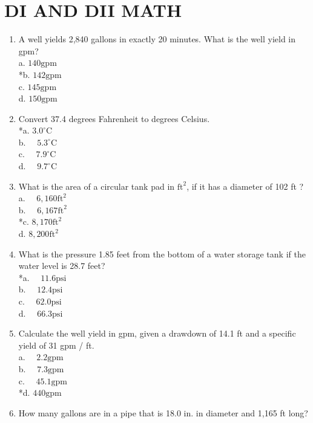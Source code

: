 \section{DI AND DII MATH}
\begin{enumerate}
\item A well yields 2,840 gallons in exactly 20 minutes. What is the well yield in gpm?\\
a. $140 \mathrm{gpm}$\\
*b. $142 \mathrm{gpm}$\\
c. $145 \mathrm{gpm}$\\
d. $150 \mathrm{gpm}$\\
\item Convert 37.4 degrees Fahrenheit to degrees Celsius.\\
*a. $3.0^{\circ} \mathrm{C}$\\
b. $\quad 5.3^{\circ} \mathrm{C}$\\
c. $\quad 7.9^{\circ} \mathrm{C}$\\
d. $\quad 9.7^{\circ} \mathrm{C}$\\
\item What is the area of a circular tank pad in $\mathrm{ft}^{2}$, if it has a diameter of 102 ft ?\\
a. $\quad 6,160 \mathrm{ft}^{2}$\\
b. $\quad 6,167 \mathrm{ft}^{2}$\\
*c. $8,170 \mathrm{ft}^{2}$\\
d. $8,200 \mathrm{ft}^{2}$\\
\item What is the pressure 1.85 feet from the bottom of a water storage tank if the water level is 28.7 feet?\\
*a. $\quad 11.6 \mathrm{psi}$\\
b. $\quad 12.4 \mathrm{psi}$\\
c. $\quad 62.0 \mathrm{psi}$\\
d. $\quad 66.3 \mathrm{psi}$\\
\item Calculate the well yield in gpm, given a drawdown of 14.1 ft and a specific yield of 31 gpm / ft.\\
a. $\quad 2.2 \mathrm{gpm}$\\
b. $\quad 7.3 \mathrm{gpm}$\\
c. $\quad 45.1 \mathrm{gpm}$\\
*d. $440 \mathrm{gpm}$\\
\item How many gallons are in a pipe that is 18.0 in. in diameter and 1,165 ft long?\\

\end{enumerate}
